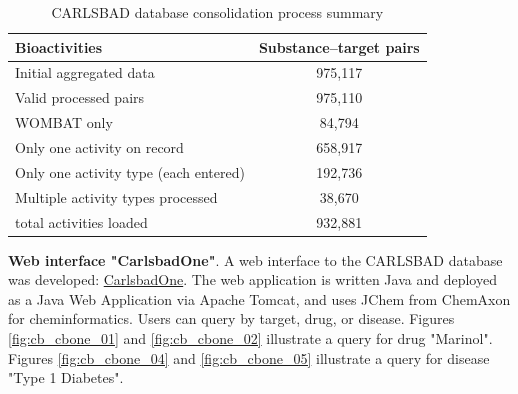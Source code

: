 \begin{table}
\caption{CARLSBAD database consolidation process summary}
\label{tab:cb_01}
\centering
\begin{tabular}{l|c}
\hline
\textbf{Bioactivities} & \textbf{Substance–target pairs} \\
\hline
Initial aggregated data & 975,117\\
Valid processed pairs & 975,110\\
WOMBAT only & 84,794\\
Only one activity on record & 658,917\\
Only one activity type (each entered) & 192,736\\ 
Multiple activity types processed & 38,670\\
total activities loaded & 932,881\\
\hline
\end{tabular}
\end{table}


\textbf{Web interface "CarlsbadOne"}. A web interface to the CARLSBAD database was developed:  \href{https://datascience.unm.edu/tomcat/carlsbad/carlsbadone}{CarlsbadOne}. The web application is written Java and deployed as a Java Web Application via Apache Tomcat, and uses JChem from ChemAxon for cheminformatics. Users can query by target, drug, or disease. Figures \ref{fig:cb_cbone_01} and \ref{fig:cb_cbone_02} illustrate a query for drug "Marinol". Figures \ref{fig:cb_cbone_04} and \ref{fig:cb_cbone_05} illustrate a query for disease "Type 1 Diabetes".

